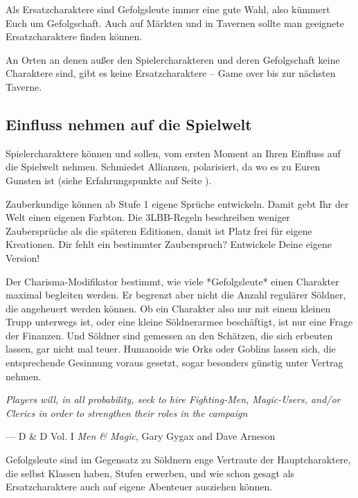 \documentclass[11pt]{wbzine}
\begin{document}
\begin{multicols}{2}
    Als Ersatzcharaktere sind Gefolgsleute immer eine gute Wahl,
    also kümmert Euch um Gefolgschaft. Auch auf Märkten und in
    Tavernen sollte man geeignete Ersatzcharaktere finden können.

    An Orten an denen außer den Spielercharakteren und deren
    Gefolgschaft keine Charaktere sind, gibt es keine
    Ersatzcharaktere – Game over bis zur nächsten Taverne.

    \subsection{Einfluss nehmen auf die Spielwelt}

    Spielercharaktere können und sollen, vom ersten Moment an Ihren
    Einfluss auf die Spielwelt nehmen. Schmiedet Allianzen,
    polarisiert, da wo es zu Euren Gunsten ist (siehe
    Erfahrungspunkte auf Seite \pageref{xp}). 

    Zauberkundige können ab Stufe 1 eigene Sprüche entwickeln. Damit
    gebt Ihr der Welt einen eigenen Farbton. Die 3LBB-Regeln
    beschreiben weniger Zaubersprüche als die späteren Editionen,
    damit ist Platz frei für eigene Kreationen. Dir fehlt ein
    bestimmter Zauberspruch? Entwickele Deine eigene Version!

    Der Charisma-Modifikator bestimmt, wie viele *Gefolgsleute*
    einen Charakter maximal begleiten werden. Er begrenzt aber nicht
    die Anzahl regulärer Söldner, die angeheuert werden können. Ob
    ein Charakter also nur mit einem kleinen Trupp unterwegs ist,
    oder eine kleine Söldnerarmee beschäftigt, ist nur eine Frage
    der Finanzen. Und Söldner sind gemessen an den Schätzen, die
    sich erbeuten lassen, gar nicht mal teuer. Humanoide wie Orks
    oder Goblins lassen sich, die entsprechende Gesinnung voraus
    gesetzt, sogar besonders günstig unter Vertrag nehmen.

    \begin{tcolorbox} 
	    \textit{Players will, in all probability, seek to hire
    		Fighting-Men, Magic-Users, and/or Clerics in order to strengthen their
    		roles in the campaign}

	--- D \& D Vol. I \textit{Men \& Magic}, Gary Gygax and Dave Arneson
    \end{tcolorbox}

    Gefolgsleute sind im Gegensatz zu Söldnern enge Vertraute der
    Hauptcharaktere, die selbst Klassen haben, Stufen erwerben, und
    wie schon gesagt als Ersatzcharaktere auch auf eigene Abenteuer
    ausziehen können.


\end{multicols}
\end{document}
